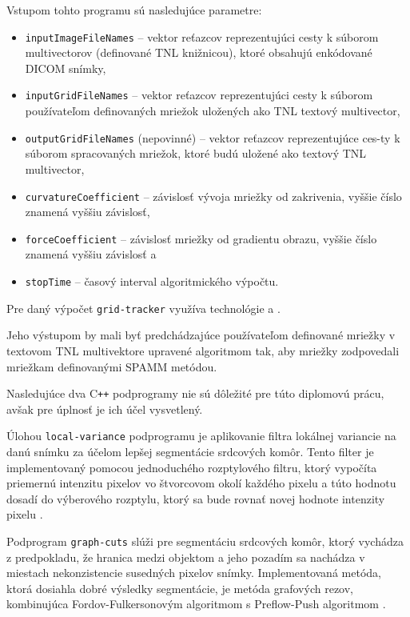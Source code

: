 Vstupom tohto programu sú nasledujúce parametre:
\begin {itemize}
\item {\texttt{inputImageFileNames} -- vektor reťazcov reprezentujúci cesty k súborom multivectorov (definované TNL knižnicou), ktoré obsahujú enkódované DICOM snímky,}
\item {\texttt{inputGridFileNames} -- vektor reťazcov reprezentujúci cesty k súborom používateľom definovaných mriežok uložených ako TNL textový multivector,}
\item {\texttt{outputGridFileNames} (nepovinné) -- vektor reťazcov reprezentujúce ces-\newline ty k súborom spracovaných mriežok, ktoré budú uložené ako textový TNL multivector,}

\item {\texttt{curvatureCoefficient} -- závislosť vývoja mriežky od zakrivenia, vyššie číslo znamená vyššiu závislosť,}
\item {\texttt{forceCoefficient} -- závislosť mriežky od gradientu obrazu, vyššie číslo znamená vyššiu závislosť a}
\item {\texttt{stopTime} -- časový interval algoritmického výpočtu.}
\end {itemize}

Pre daný výpočet \texttt{grid-tracker} využíva technológie  a .

Jeho výstupom by mali byť predchádzajúce používateľom definované mriežky v textovom TNL multivektore upravené algoritmom tak, aby mriežky zodpovedali mriežkam definovanými SPAMM metódou.

Nasledujúce dva C\texttt{++} podprogramy nie sú dôležité pre túto diplomovú prácu, avšak pre úplnosť je ich účel vysvetlený.

Úlohou \texttt{local-variance} podprogramu je aplikovanie filtra lokálnej variancie na danú snímku za účelom lepšej segmentácie srdcových komôr. Tento filter je implementovaný pomocou jednoduchého rozptylového filtru, ktorý vypočíta priemernú intenzitu pixelov vo štvorcovom okolí každého pixelu a túto hodnotu dosadí do výberového rozptylu, ktorý sa bude rovnať novej hodnote intenzity pixelu \cite{master_thesis_app}.

Podprogram \texttt{graph-cuts} slúži pre segmentáciu srdcových komôr, ktorý vychádza z predpokladu, že hranica medzi objektom a jeho pozadím sa nachádza v miestach nekonzistencie susedných pixelov snímky. Implementovaná metóda, ktorá dosiahla dobré výsledky segmentácie, je metóda grafových rezov, kombinujúca Fordov-Fulkersonovým algoritmom s Preflow-Push algoritmom \cite{master_thesis_app}.

